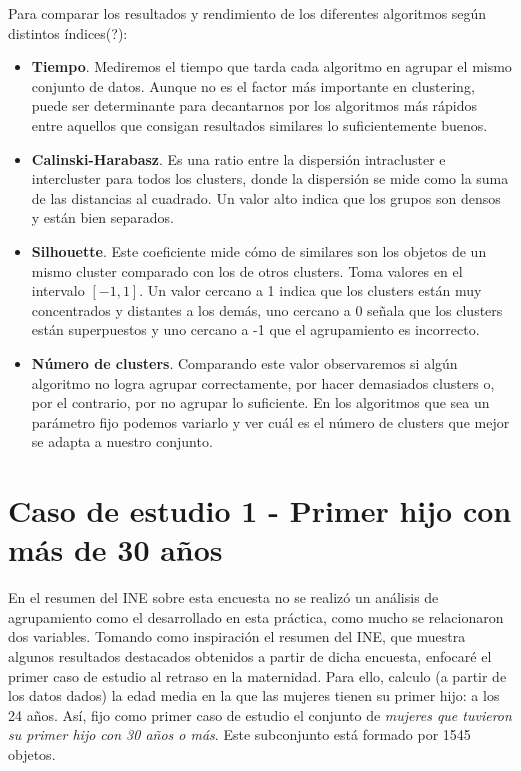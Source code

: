 \documentclass[a4paper, 20pt]{article}
\begin{document}
Para comparar los resultados y rendimiento de los diferentes algoritmos según distintos índices(?):
\begin{itemize}
\item \textbf{Tiempo}. Mediremos el tiempo que tarda cada algoritmo en agrupar el mismo conjunto de datos. Aunque no es el factor más importante en clustering, puede ser determinante para decantarnos por los algoritmos más rápidos entre aquellos que consigan resultados similares lo suficientemente buenos.
\item \textbf{Calinski-Harabasz}. Es una ratio entre la dispersión intracluster e intercluster para todos los clusters, donde la dispersión se mide como la suma de las distancias al cuadrado. Un valor alto indica que los grupos son densos y están bien separados.
\item \textbf{Silhouette}. Este coeficiente mide cómo de similares son los objetos de un mismo cluster comparado con los de otros clusters. Toma valores en el intervalo $[-1,1]$. Un valor cercano a 1 indica que los clusters están muy concentrados y distantes a los demás, uno cercano a 0 señala que los clusters están superpuestos y uno cercano a -1 que el agrupamiento es incorrecto.
\item \textbf{Número de clusters}. Comparando este valor observaremos si algún algoritmo no logra agrupar correctamente, por hacer demasiados clusters o, por el contrario, por no agrupar lo suficiente. En los algoritmos que sea un parámetro fijo podemos variarlo y ver cuál es el número de clusters que mejor se adapta a nuestro conjunto.
\end{itemize}

\section{Caso de estudio 1 - Primer hijo con más de 30 años}
En el resumen del INE sobre esta encuesta no se realizó un análisis de agrupamiento como el desarrollado en esta práctica, como mucho se relacionaron dos variables. Tomando como inspiración el resumen \cite{resINE} del INE, que muestra algunos resultados destacados obtenidos a partir de dicha encuesta, enfocaré el primer caso de estudio al retraso en la maternidad. Para ello, calculo (a partir de los datos dados) la edad media en la que las mujeres tienen su primer hijo: a los 24 años. Así, fijo como primer caso de estudio el conjunto de \textit{mujeres que tuvieron su primer hijo con 30 años o más}. Este subconjunto está formado por 1545 objetos.
\end{document}
